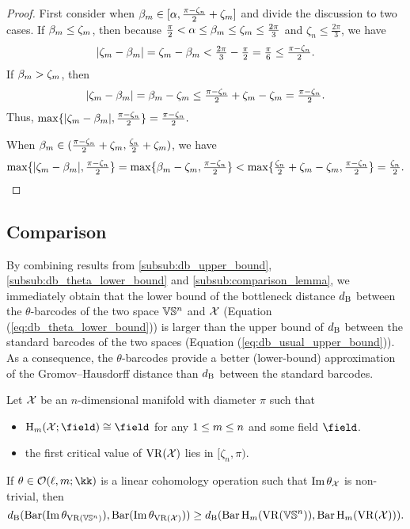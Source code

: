 \begin{proof}
        First consider when $\beta_m \in [\alpha, \tfrac{\pi - \zeta_n}{2}+\zeta_m]$ and divide the discussion to two cases.  
        If $\beta_m \leq \zeta_m$, then because $\tfrac{\pi}{2} < \alpha \leq \beta_m \leq \zeta_m  \leq \tfrac{2\pi}{3}$ and $\zeta_n \leq \tfrac{2\pi}{3}$, we have
        \[
            |\zeta_m  - \beta_m | 
            = \zeta_m  - \beta_m  
            < \tfrac{2\pi}{3} - \tfrac{\pi}{2} 
            = \tfrac{\pi}{6} 
            \leq \tfrac{\pi - \zeta_n}{2}.
        \]
        If $\beta_m > \zeta_m$, then 
        \[
            |\zeta_m  - \beta_m | 
            = \beta_m - \zeta_m
            \leq \tfrac{\pi - \zeta_n}{2} + \zeta_m - \zeta_m 
            = \tfrac{\pi - \zeta_n}{2}.
        \]
        Thus, $\max\{|\zeta_m  - \beta_m |, \tfrac{\pi - \zeta_n}{2}\} = \tfrac{\pi - \zeta_n}{2}.$
        
        When $\beta_m \in (\tfrac{\pi - \zeta_n}{2}+\zeta_m, \tfrac{\zeta_n}{2}+\zeta_m)$, we have
        \[
            \max\{|\zeta_m  - \beta_m |, \tfrac{\pi - \zeta_n}{2}\}
            = \max\{\beta_m - \zeta_m, \tfrac{\pi - \zeta_n}{2}\}
            < \max\{\tfrac{\zeta_n}{2}+\zeta_m - \zeta_m, \tfrac{\pi - \zeta_n}{2}\}
            = \tfrac{\zeta_n}{2} .
        \]
\end{proof}

\subsection{Comparison}
\label{subsub:main_theorem}

By combining results from \cref{subsub:db_upper_bound}, \cref{subsub:db_theta_lower_bound} and \cref{subsub:comparison_lemma}, we immediately obtain that the lower bound of the bottleneck distance $d_{\mathrm{B}}$ between the $\theta$-barcodes of the two space $\mathbb{V}\mathbb{S}^n$ and $\mathcal{X}$ (Equation (\ref{eq:db_theta_lower_bound})) is larger than the upper bound of $d_{\mathrm{B}}$ between the standard barcodes of the two spaces (Equation (\ref{eq:db_usual_upper_bound})). 
As a consequence, the $\theta$-barcodes provide a better (lower-bound) approximation of the Gromov--Hausdorff distance than $d_{\mathrm{B}}$ between the standard barcodes.

\medskip\proposition
Let $\mathcal{X}$ be an $n$-dimensional manifold with diameter $\pi$ such that
\begin{itemize}
    \item $\mathrm{H}_\degp (\cX; \field)\cong \field$ for any $1\leq m\leq n$ and some field $\field$.
    \item the first critical value of $\operatorname{VR}(\mathcal{X})$ lies in $[\zeta_n, \pi)$.
\end{itemize}
If $\theta \in \cO(\ell, \degp; \kk)$ is a linear cohomology operation such that $\operatorname{Im} \theta_{\mathcal{X}}$ is non-trivial, then
\[\db(\thetabarc{\VS^n}, \thetabarc{\cX}) \geq \db(\Hbarc[\field]{\degp}{\VS^n}, \Hbarc[\field]{\degp}{\cX}).\]

